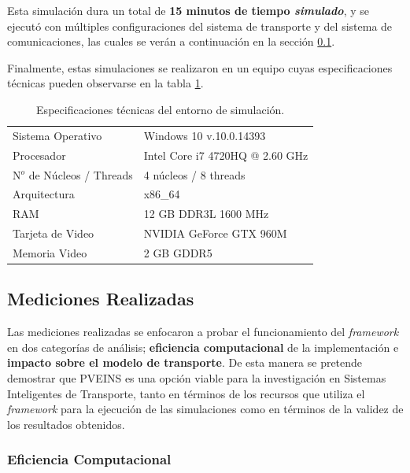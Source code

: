 Esta simulación dura un total de \textbf{15 minutos de tiempo \emph{simulado}}, y se ejecutó con múltiples configuraciones del sistema de transporte y del sistema de comunicaciones, las cuales se verán a continuación en la sección \ref{sec:measurements}.

Finalmente, estas simulaciones se realizaron en un equipo cuyas especificaciones técnicas pueden observarse en la tabla \ref{table:systemspecs}.

\begin{table}[tpb]
    \centering
    \begin{tabular}{@{}ll@{}}
        \toprule
        Sistema Operativo     & Windows 10 v.10.0.14393         \\
        Procesador            & Intel Core i7 4720HQ @ 2.60 GHz \\
        N$^{o}$ de Núcleos / Threads & 4 núcleos / 8 threads\\
        Arquitectura          & x86\_64                         \\
        RAM                   & 12 GB DDR3L 1600 MHz            \\
        Tarjeta de Video      & NVIDIA GeForce GTX 960M         \\
        Memoria Video         & 2 GB GDDR5                      \\ \bottomrule
    \end{tabular}
    \caption{Especificaciones técnicas del entorno de simulación.}
    \label{table:systemspecs}
\end{table}

\subsection{Mediciones Realizadas} \label{sec:measurements}

Las mediciones realizadas se enfocaron a probar el funcionamiento del \emph{framework} en dos categorías de análisis; \textbf{eficiencia computacional} de la implementación e \textbf{impacto sobre el modelo de transporte}. De esta manera se pretende demostrar que PVEINS es una opción viable para la investigación en Sistemas Inteligentes de Transporte, tanto en términos de los recursos que utiliza el \emph{framework} para la ejecución de las simulaciones como en términos de la validez de los resultados obtenidos.

\subsubsection{Eficiencia Computacional}

